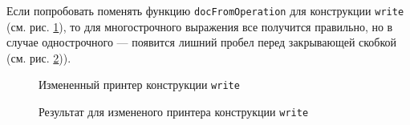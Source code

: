 Если попробовать поменять функцию \lstinline[language=Haskell]{docFromOperation} для конструкции \lstinline[language=llang]{write} (см. рис. \ref{fig:lHughesWriteChange}),
то для многострочного выражения все получится правильно, но в случае однострочного --- появится лишний пробел перед закрывающей скобкой (см. рис. \ref{fig:lBadWriteEx})).

\begin{figure}[h!]
	
	\caption{Измененный принтер конструкции \lstinline[language=llang]{write}}
	\label{fig:lHughesWriteChange}
\end{figure}

\begin{figure}[h!]
	
	\caption{Результат для измененого принтера конструкции \lstinline[language=llang]{write}}
	\label{fig:lBadWriteEx}
\end{figure}
